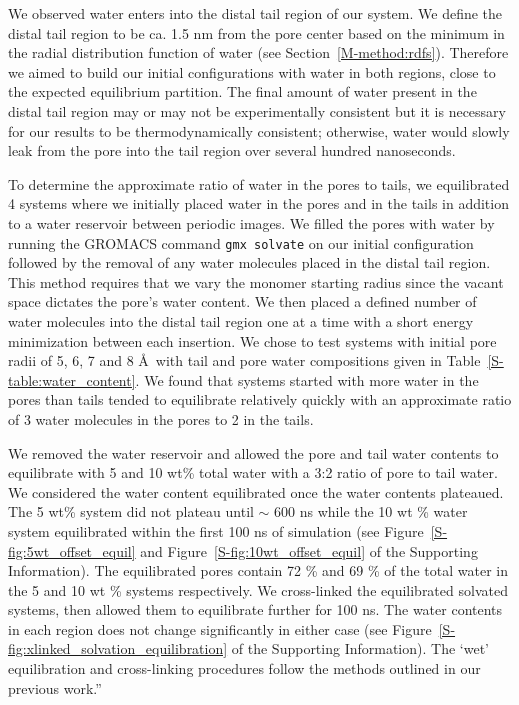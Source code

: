 \documentclass{article}
\begin{document}
\begin{enumerate}
	We observed water enters into the distal tail region of our system. We define the 
	distal tail region to be ca. 1.5 nm from the pore center based on the minimum in 
	the radial distribution function of water (see Section~\ref{M-method:rdfs}). Therefore
	we aimed to build our initial configurations with water in both regions, close to
	the expected equilibrium partition. The final amount of water present in the distal
	tail region may or may not be experimentally consistent but it is necessary for our
	results to be thermodynamically consistent; otherwise, water would slowly leak 
	from the pore into the tail region over several hundred nanoseconds. 
	
	To determine the approximate ratio of water in the pores to tails, we equilibrated 4 systems
	where we initially placed water in the pores and in the tails in addition to a water
	reservoir between periodic images. We filled the pores with water by running the 
	GROMACS command \texttt{gmx solvate} on our initial configuration followed by the 
	removal of any water molecules placed in the distal tail region. This method requires
	that we vary the monomer starting radius since the vacant space dictates the pore's 
	water content. We then placed a defined number of water molecules into the distal tail
	region one at a time with a short energy minimization between each insertion.
	We chose to test systems with initial pore radii of 5, 6, 7 and 8 \AA~with tail and 
	pore water compositions given in Table~\ref{S-table:water_content}. We found that 
	systems started with more water in the pores than tails tended to equilibrate relatively
	quickly with an approximate ratio of 3 water molecules in the pores to 2 in the tails.
  
    We removed the water reservoir and allowed the pore and tail water
    contents to equilibrate with 5 and 10 wt\% total water with a 3:2 ratio
    of pore to tail water. We considered the water content
    equilibrated once the water contents plateaued. The 5 wt\% system did
    not plateau until $\sim$ 600 ns while the 10 wt \% water system equilibrated within the first 100 ns of 
    simulation (see Figure~\ref{S-fig:5wt_offset_equil} and Figure~\ref{S-fig:10wt_offset_equil} of
    the Supporting Information). The equilibrated pores contain 72 \% and 69 \% of the total water in the
    5 and 10 wt \% systems respectively. We cross-linked the equilibrated 
    solvated systems, then allowed them to equilibrate further for 100 ns. 
    The water contents in each region does not change significantly in either case 
    (see Figure~\ref{S-fig:xlinked_solvation_equilibration} of the Supporting Information).
    The `wet' equilibration and cross-linking procedures follow
    the methods outlined in our previous work.''

\end{enumerate}

%
%
\end{document}
